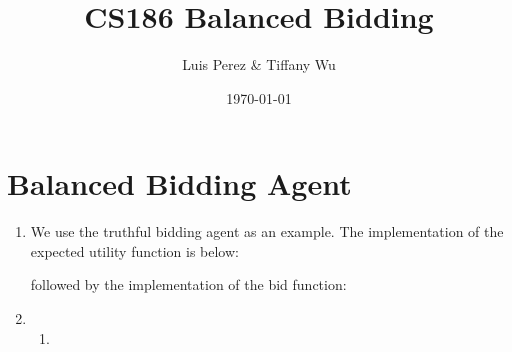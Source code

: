 \documentclass[11pt]{article}
\title{CS186 Balanced Bidding}
\author{Luis Perez \& Tiffany Wu}
\date{\today}
\begin{document}
\maketitle

\section*{Balanced Bidding Agent}
\begin{enumerate}
\item We use the truthful bidding agent as an example. The  implementation of the expected utility function is below:

  
  

  followed by the implementation of the bid function:

  
  
\item 
  \begin{enumerate}
  \item 
  \end{enumerate}
\end{enumerate}
\end{document}
